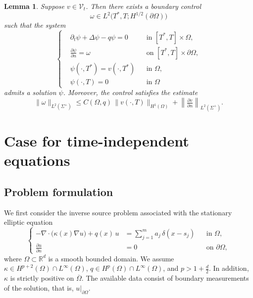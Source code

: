 \documentclass[12pt]{amsart}
\newtheorem{lem}[thm]{Lemma}
\begin{document}
\begin{lem}\label{lemma:control estimate}
Suppose $v\in \mathcal{V}_t$. Then there exists a boundary control 
\[
\omega\in L^2\bigl(T^*,T;H^{1/2}(\partial\Omega)\bigr)
\]
such that the system
\begin{equation}\label{control system}
\left\{
\begin{aligned}
&\partial_t \psi + \Delta \psi - q\psi = 0 && \text{in } [T^*,T]\times\Omega,\\
&\frac{\partial\psi}{\partial n} = \omega && \text{on } [T^*,T]\times\partial\Omega,\\
&\psi(\cdot,T^*) = v(\cdot,T^*) && \text{in } \Omega,\\
&\psi(\cdot,T)=0 && \text{in } \Omega
\end{aligned}
\right.
\end{equation}
admits a solution $\psi$. Moreover, the control satisfies the estimate
\begin{equation}\label{control estimate}
\|\omega\|_{L^2(\Sigma^+)}
\le C(\Omega,q)\,\|v(\cdot,T)\|_{H^1(\Omega)}
+ \left\|\tfrac{\partial v}{\partial n}\right\|_{L^2(\Sigma^+)}.
\end{equation}
\end{lem}

\section{Case for time-independent equations}

\subsection{Problem formulation}

We first consider the inverse source problem associated with the stationary elliptic equation
\begin{equation}\label{directmodel}
\left\{
\begin{aligned}
-\nabla\!\cdot\!\bigl(\kappa(x)\nabla u\bigr) + q(x)\,u &= \sum_{j=1}^{m} a_j\,\delta(x-s_j) && \text{in }\Omega,\\
\frac{\partial u}{\partial n} &= 0 && \text{on }\partial\Omega,
\end{aligned}
\right.
\end{equation}
where $\Omega\subset\mathbb{R}^d$ is a smooth bounded domain. We assume $\kappa\in H^{p+2}(\Omega)\cap L^\infty(\Omega)$, $q\in H^{p}(\Omega)\cap L^\infty(\Omega)$, and $p>1+\frac{d}{2}$. In addition, $\kappa$ is strictly positive on $\overline\Omega$. The available data consist of boundary measurements of the solution, that is, $u|_{\partial\Omega}$.
\end{document}
